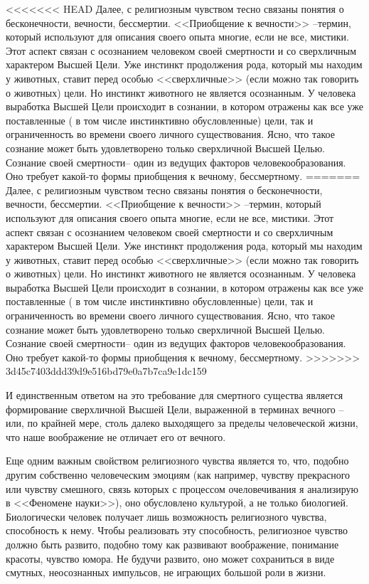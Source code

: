 \documentclass{book}
\begin{document}
<<<<<<< HEAD
Далее, с религиозным чувством тесно связаны понятия о бесконечности, вечности, бессмертии. <<Приобщение к вечности>> --термин, который используют для описания своего опы­та многие, если не все, мистики. Этот аспект связан с осозна­нием человеком своей смертности и со сверхличным  характе­ром Высшей Цели. Уже инстинкт продолжения рода, который мы находим у животных, ставит перед особью <<сверхличные>> (если можно так говорить о животных) цели. Но инстинкт жи­вотного не является осознанным. У человека выработка Выс­шей Цели происходит в сознании, в котором отражены как все уже поставленные ( в том числе инстинктивно обусловленные) цели, так и ограниченность во времени своего личного сущест­вования. Ясно, что такое сознание может быть удовлетворено только сверхличной Высшей Целью. Сознание своей смертно­сти-- один из ведущих факторов человекообразования. Оно тре­бует какой‑то формы приобщения к вечному, бессмертному.
=======
Далее, с религиозным чувством тесно связаны понятия о бесконечности, вечности, бессмертии. <<Приобщение к вечности>> --термин, который используют для описания своего опы­та многие, если не все, мистики. Этот аспект связан с осозна­нием человеком своей смертности и со сверхличным  характе­ром Высшей Цели. Уже инстинкт продолжения рода, который мы находим у животных, ставит перед особью <<сверхличные>> (если можно так говорить о животных) цели. Но инстинкт жи­вотного не является осознанным. У человека выработка Выс­шей Цели происходит в сознании, в котором отражены как все уже поставленные ( в том числе инстинктивно обусловленные) цели, так и ограниченность во времени своего личного сущест­вования. Ясно, что такое сознание может быть удовлетворено только сверхличной Высшей Целью. Сознание своей смертно­сти-- один из ведущих факторов человекообразования. Оно тре­бует какой-то формы приобщения к вечному, бессмертному.
>>>>>>> 3d45c7403ddd39d9e516bd79e0a7b7ca9e1dc159

И единственным ответом на это требование для смертного су­щества является формирование сверхличной Высшей Цели, выраженной в терминах вечного -- или, по крайней мере, столь далеко выходящего за пределы человеческой жизни, что наше воображение не отличает его от вечного.

Еще одним важным свойством религиозного чувства являет­ся то, что, подобно другим собственно человеческим эмоциям (как например, чувству прекрасного или чувству смешного, связь которых с процессом очеловечивания я анализирую в <<Феномене науки>>), оно обусловлено культурой,  а не только биологией. Биологически человек получает лишь возможность религиозного чувства, способность  к нему. Чтобы реализовать эту способность, религиозное чувство должно быть развито, подобно тому как развивают воображение, понимание красоты, чувство юмора. Не будучи развито, оно может сохраниться в виде смутных, неосознанных импульсов, не играющих большой роли в жизни.
\end{document}

